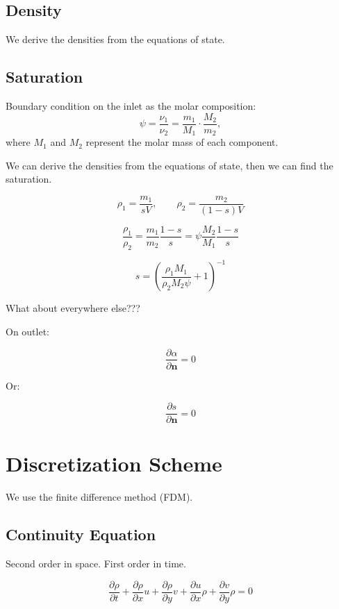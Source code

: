 \documentclass[a4paper,12pt]{article}
\begin{document}
\subsection{Density}

We derive the densities from the equations of state.

\subsection{Saturation}
    Boundary condition on the inlet as the molar
    composition:
    \[
        \psi = \frac{\nu_1}{\nu_2} = \frac{m_1}{M_1}
        \cdot \frac{M_2}{m_2},
    \] 
    where \(M_1\) and \(M_2\) represent the molar mass 
    of each component.

    We can derive the densities from the equations of state,
    then we can find the saturation.

    \[
    \rho_1 = \frac{m_1}{sV}, \qquad
    \rho_2 = \frac{m_2}{(1 - s)V}
    \] 

    \[
    \frac{\rho_1}{\rho_2} = \frac{m_1}{m_2}
    \frac{1 - s}{s}
    = \psi \frac{M_2}{M_1}\frac{1 - s}{s}
    \] 

    \[
        s = \left( 
        \frac{\rho_1 M_1}{\rho_2 M_2 \psi} + 1 \right)^{-1}
    \] 

    {\color{red}What about everywhere else???}

    On outlet:

    \[
    \frac{\partial \alpha}{\partial \bm{n}} = 0
    \] 

    Or:

    \[
    \frac{\partial s}{\partial \bm{n}} = 0 
    \] 

\section{Discretization Scheme}

We use the finite difference method (FDM).

\subsection{Continuity Equation}

Second order in space. First order in time.

\[
\frac{\partial \rho}{\partial t}
+ \frac{\partial \rho}{\partial x} u
+ \frac{\partial \rho}{\partial y} v
+ \frac{\partial u}{\partial x} \rho
+ \frac{\partial v}{\partial y} \rho = 0
\] 
\end{document}
